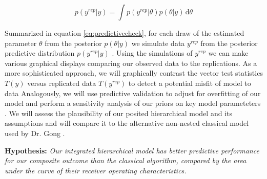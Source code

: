 \documentclass[11pt,notitlepage]{article}
\begin{document}
\begin{figure}
\vspace{-25pt}
\begin{equation} \label{eq:predictivecheck}
 p(y^{rep}|y)  = \int \! p(y^{rep}|\theta) p(\theta|y) \, \mathrm{d}\theta 
\end{equation}
\vspace{-25pt}
\end{figure}

\vspace{5pt} Summarized in equation \ref{eq:predictivecheck}, for each draw of the estimated parameter $\theta$ from the posterior $p(\theta|y)$ we simulate data $y^{rep}$ from the posterior predictive distribution $ p(y^{rep}|y) $ . Using the simulations of $y^{rep}$ we can make various graphical displays comparing our observed data to the replications. As a more sophisticated approach, we will graphically contrast the vector test statistics $T(y)$ versus replicated data $T(y^{rep})$ to detect a potential misfit of model to data \cite{Gelman2004posteriorpredictivechecks,Buja1999inference} Analogously, we will use predictive validation to adjust for overfitting of our model and perform a sensitivity analysis of our priors on key model parameteters \cite{Gelman-Hill_2014,Gelman_predictive_2000}. We will assess the plausibility of our posited hierarchical model and its assumptions \cite{Gelman_predictive_2000,GelmanMengStern1996} and will compare it to the alternative non-nested classical model used by Dr. Gong \cite{Herridge_12594312}.

\begin{flushleft}
\textbf{Hypothesis:} \textit{Our integrated hierarchical model has better predictive performance for our composite outcome than the classical algorithm, compared by the area under the curve of their receiver operating characteristics.}
\end{flushleft}
\vspace{-5pt}
\end{document}
